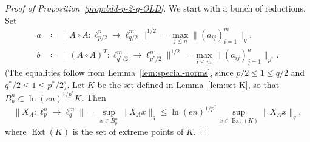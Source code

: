 \documentclass[a4paper]{amsart}
\theoremstyle{definition}
\theoremstyle{remark}
\numberwithin{equation}{section}
\newcommand*{\hadprod}{\mathbin{\circ}} %
\newcommand*{\Ext}{\operatorname{Ext}} %
\begin{document}
\begin{proof}[Proof of Proposition~\ref{prop:bdd-p-2-q-OLD}]
	We start with a bunch of reductions.
	Set
	\begin{align*}
	a&\coloneqq \|A\hadprod A \colon \ell^n_{p/2} \to \ell^m_{q/2}\|^{1/2} = \max_{j\leq n} \| (a_{ij})_{i=1}^m\|_q, \\
	b&\coloneqq \|(A\hadprod A)^T \colon \ell^m_{q^*/2} \to \ell^n_{p^*/2}\|^{1/2} = \max_{i\leq m} \| (a_{ij})_{j=1}^n\|_{p^*}.
	\end{align*}	
	(The equalities follow from Lemma~\ref{lem:special-norms}, since $p/2\leq 1\leq q/2$ and $ q^*/2 \leq 1\leq p^*/2$).
		Let $K$ be the set defined in Lemma~\ref{lem:set-K},
	so that $B_p^n\subset \ln(en)^{1/p^*} K$.
	Then
	\begin{equation}
	\label{eq:bdd-reduction-to-K-OLD}
	\|X_A \colon \ell^n_p\to \ell^m_q\|
	=  \sup_{x\in B_p^n} \|X_A x\|_q
	\leq  \ln(en)^{1/p^*}\! \sup_{x\in \Ext (K)}\! \|X_A x\|_q,
	\end{equation}
	where  $\Ext(K)$ is the set of
	extreme points of $K$.
	

\end{proof}
\end{document}
